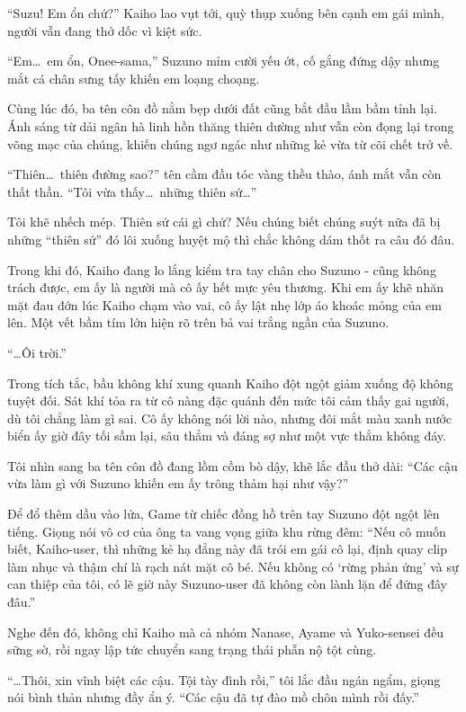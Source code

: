 \documentclass[../main.tex]{subfiles}
\begin{document}
``Suzu! Em ổn chứ?'' Kaiho lao vụt tới, quỳ thụp xuống bên cạnh em gái mình, người vẫn đang thở dốc vì kiệt sức.

``Em\dots\ em ổn, Onee-sama,'' Suzuno mỉm cười yếu ớt, cố gắng đứng dậy nhưng mắt cá chân sưng tấy khiến em loạng choạng.

Cùng lúc đó, ba tên côn đồ nằm bẹp dưới đất cũng bắt đầu lầm bầm tỉnh lại. Ánh sáng từ dải ngân hà linh hồn thăng thiên dường như vẫn còn đọng lại trong võng mạc của chúng, khiến chúng ngơ ngác như những kẻ vừa từ cõi chết trở về.

``Thiên\dots\ thiên đường sao?'' tên cầm đầu tóc vàng thều thào, ánh mắt vẫn còn thất thần. ``Tôi vừa thấy\dots\ những thiên sứ\dots''

Tôi khẽ nhếch mép. Thiên sứ cái gì chứ? Nếu chúng biết chúng suýt nữa đã bị những ``thiên sứ'' đó lôi xuống huyệt mộ thì chắc không dám thốt ra câu đó đâu.

Trong khi đó, Kaiho đang lo lắng kiểm tra tay chân cho Suzuno - cũng không trách được, em ấy là người mà cô ấy hết mực yêu thương. Khi em ấy khẽ nhăn mặt đau đớn lúc Kaiho chạm vào vai, cô ấy lật nhẹ lớp áo khoác mỏng của em lên. Một vết bầm tím lớn hiện rõ trên bả vai trắng ngần của Suzuno.

``\dots Ôi trời.''

Trong tích tắc, bầu không khí xung quanh Kaiho đột ngột giảm xuống độ không tuyệt đối. Sát khí tỏa ra từ cô nàng đặc quánh đến mức tôi cảm thấy gai người, dù tôi chẳng làm gì sai. Cô ấy không nói lời nào, nhưng đôi mắt màu xanh nước biển ấy giờ đây tối sầm lại, sâu thẳm và đáng sợ như một vực thẳm không đáy.

Tôi nhìn sang ba tên côn đồ đang lồm cồm bò dậy, khẽ lắc đầu thở dài: ``Các cậu vừa làm gì với Suzuno khiến em ấy trông thảm hại như vậy?''

Để đổ thêm dầu vào lửa, Game từ chiếc đồng hồ trên tay Suzuno đột ngột lên tiếng. Giọng nói vô cơ của ông ta vang vọng giữa khu rừng đêm: ``Nếu cô muốn biết, Kaiho-user, thì những kẻ hạ đẳng này đã trói em gái cô lại, định quay clip làm nhục và thậm chí là rạch nát mặt cô bé. Nếu không có `rừng phản ứng' và sự can thiệp của tôi, có lẽ giờ này Suzuno-user đã không còn lành lặn để đứng đây đâu.''

Nghe đến đó, không chỉ Kaiho mà cả nhóm Nanase, Ayame và Yuko-sensei đều sững sờ, rồi ngay lập tức chuyển sang trạng thái phẫn nộ tột cùng.

``\dots Thôi, xin vĩnh biệt các cậu. Tội tày đình rồi,'' tôi lắc đầu ngán ngẩm, giọng nói bình thản nhưng đầy ẩn ý. ``Các cậu đã tự đào mồ chôn mình rồi đấy.''
\end{document}
